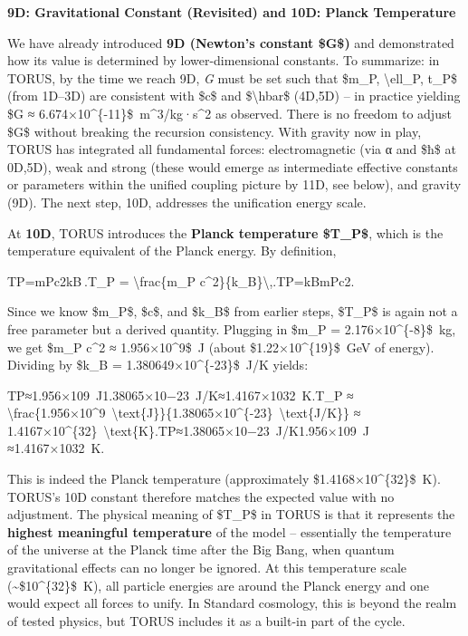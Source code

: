 \documentclass[]{article}
\begin{document}
\textbf{9D: Gravitational Constant (Revisited) and 10D: Planck
Temperature}

We have already introduced \textbf{9D (Newton's constant \$G\$)} and
demonstrated how its value is determined by lower-dimensional constants.
To summarize: in TORUS, by the time we reach 9D, \emph{G} must be set
such that \$m\_P, \textbackslash{}ell\_P, t\_P\$ (from 1D--3D) are
consistent with \$c\$ and \$\textbackslash{}hbar\$ (4D,5D) -- in
practice yielding \$G ≈ 6.674×10\^{}\{-11\}\$~m\^{}3/kg·s\^{}2 as
observed​. There is no freedom to adjust \$G\$ without breaking the
recursion consistency. With gravity now in play, TORUS has integrated
all fundamental forces: electromagnetic (via α and \$ħ\$ at 0D,5D), weak
and strong (these would emerge as intermediate effective constants or
parameters within the unified coupling picture by 11D, see below), and
gravity (9D). The next step, 10D, addresses the unification energy
scale.

At \textbf{10D}, TORUS introduces the \textbf{Planck temperature
\$T\_P\$}, which is the temperature equivalent of the Planck energy. By
definition,

TP=mPc2kB .T\_P = \textbackslash{}frac\{m\_P
c\^{}2\}\{k\_B\}\textbackslash{},.TP​=kB​mP​c2​.

Since we know \$m\_P\$, \$c\$, and \$k\_B\$ from earlier steps, \$T\_P\$
is again not a free parameter but a derived quantity. Plugging in \$m\_P
= 2.176×10\^{}\{-8\}\$~kg, we get \$m\_P c\^{}2 ≈ 1.956×10\^{}9\$~J
(about \$1.22×10\^{}\{19\}\$~GeV of energy)​. Dividing by \$k\_B =
1.380649×10\^{}\{-23\}\$~J/K yields:

TP≈1.956×109~J1.38065×10−23~J/K≈1.4167×1032~K.T\_P ≈
\textbackslash{}frac\{1.956×10\^{}9~\textbackslash{}text\{J\}\}\{1.38065×10\^{}\{-23\}~\textbackslash{}text\{J/K\}\}
≈
1.4167×10\^{}\{32\}~\textbackslash{}text\{K\}.TP​≈1.38065×10−23~J/K1.956×109~J​≈1.4167×1032~K.

This is indeed the Planck temperature (approximately
\$1.4168×10\^{}\{32\}\$~K)​. TORUS's 10D constant therefore matches the
expected value with no adjustment. The physical meaning of \$T\_P\$ in
TORUS is that it represents the \textbf{highest meaningful temperature}
of the model -- essentially the temperature of the universe at the
Planck time after the Big Bang, when quantum gravitational effects can
no longer be ignored. At this temperature scale
(\textasciitilde{}\$10\^{}\{32\}\$~K), all particle energies are around
the Planck energy and one would expect all forces to unify. In Standard
cosmology, this is beyond the realm of tested physics, but TORUS
includes it as a built-in part of the cycle.
\end{document}

